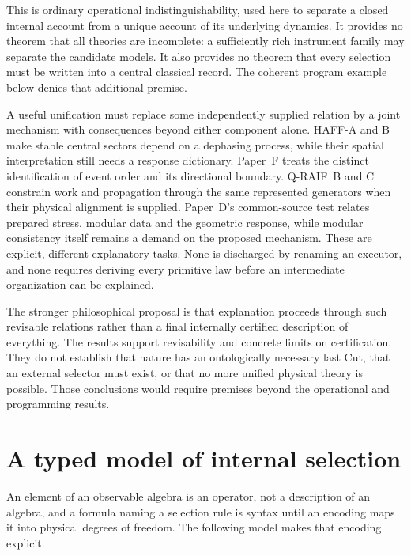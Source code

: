 \documentclass[12pt,a4paper]{article}
\begin{document}
This is ordinary operational indistinguishability, used here to separate
a closed internal account from a unique account of its underlying
dynamics. It provides no theorem that all theories are incomplete:
a sufficiently rich instrument family may separate the candidate models.
It also provides no theorem that every selection must be written into a
central classical record. The coherent program example below denies that
additional premise.

A useful unification must replace some independently supplied relation
by a joint mechanism with consequences beyond either component alone.
HAFF-A and B make stable central sectors depend on a dephasing process,
while their spatial interpretation still needs a response dictionary.
Paper~F treats the distinct identification of event order and its
directional boundary. Q-RAIF~B and C constrain work and propagation
through the same represented generators when their physical alignment
is supplied. Paper~D's common-source test relates prepared stress,
modular data and the geometric response, while modular consistency
itself remains a demand on the proposed mechanism.
These are explicit, different explanatory tasks. None is discharged by
renaming an executor, and none requires deriving every primitive law
before an intermediate organization can be explained.

The stronger philosophical proposal is that explanation proceeds through
such revisable relations rather than a final internally certified
description of everything. The results support revisability and concrete
limits on certification. They do not establish that nature has an
ontologically necessary last Cut, that an external selector must exist,
or that no more unified physical theory is possible. Those conclusions
would require premises beyond the operational and programming results.

\section{A typed model of internal selection}
\label{sec:model}

An element of an observable algebra is an operator, not a description of an algebra, and a formula naming a selection rule is syntax until an encoding maps it into physical degrees of freedom. The following model makes that encoding explicit.
\end{document}
